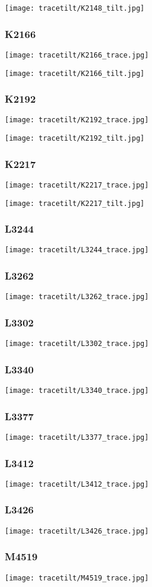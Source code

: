 \texttt{[image: tracetilt/K2148\_tilt.jpg]}

\subsubsection{K2166}
\texttt{[image: tracetilt/K2166\_trace.jpg]}

\texttt{[image: tracetilt/K2166\_tilt.jpg]}

\subsubsection{K2192}
\texttt{[image: tracetilt/K2192\_trace.jpg]}

\texttt{[image: tracetilt/K2192\_tilt.jpg]}

\subsubsection{K2217}
\texttt{[image: tracetilt/K2217\_trace.jpg]}

\texttt{[image: tracetilt/K2217\_tilt.jpg]}

\subsubsection{L3244}
\texttt{[image: tracetilt/L3244\_trace.jpg]}
\subsubsection{L3262}
\texttt{[image: tracetilt/L3262\_trace.jpg]}
\subsubsection{L3302}
\texttt{[image: tracetilt/L3302\_trace.jpg]}
\subsubsection{L3340}
\texttt{[image: tracetilt/L3340\_trace.jpg]}
\subsubsection{L3377}
\texttt{[image: tracetilt/L3377\_trace.jpg]}
\subsubsection{L3412}
\texttt{[image: tracetilt/L3412\_trace.jpg]}
\subsubsection{L3426}
\texttt{[image: tracetilt/L3426\_trace.jpg]}
\subsubsection{M4519}
\texttt{[image: tracetilt/M4519\_trace.jpg]}

